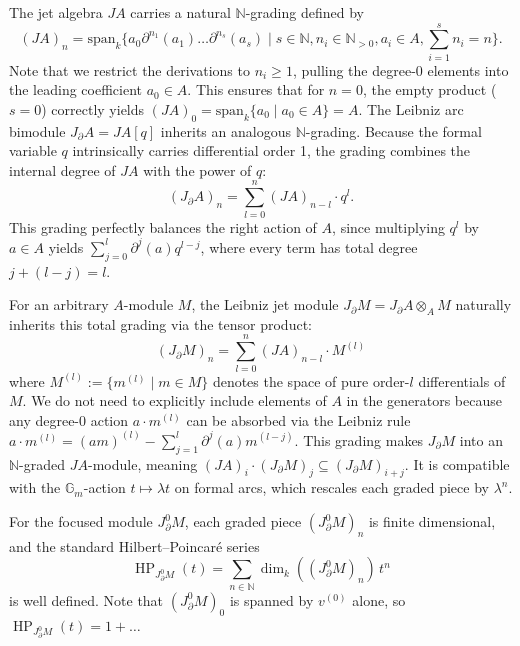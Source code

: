 \documentclass[a4paper, 12pt]{amsart}
\theoremstyle{definition}
\theoremstyle{remark}
\begin{document}
The jet algebra $JA$ carries a natural $\mathbb{N}$-grading defined by
\begin{equation*}
  (JA)_n = \text{span}_k\{a_0 \partial^{n_1}(a_1)\dots\partial^{n_s}(a_s) \mid s \in \mathbb{N}, n_i \in \mathbb{N}_{>0}, a_i \in A, \sum_{i=1}^s n_i = n\}.
\end{equation*}
Note that we restrict the derivations to $n_i \ge 1$, pulling the degree-0 elements into the leading coefficient $a_0 \in A$. This ensures that for $n=0$, the empty product ($s=0$) correctly yields $(JA)_0 = \text{span}_k\{a_0 \mid a_0 \in A\} = A$.
The Leibniz arc bimodule $J_\partial A = JA[q]$ inherits an analogous $\mathbb{N}$-grading. Because the formal variable $q$ intrinsically carries differential order 1, the grading combines the internal degree of $JA$ with the power of $q$:
\begin{equation*}
  (J_\partial A)_n = \sum_{l=0}^n (JA)_{n-l} \cdot q^l.
\end{equation*}
This grading perfectly balances the right action of $A$, since multiplying $q^l$ by $a \in A$ yields $\sum_{j=0}^l \partial^j(a) q^{l-j}$, where every term has total degree $j + (l-j) = l$.

For an arbitrary $A$-module $M$, the Leibniz jet module $J_\partial M = J_\partial A \otimes_A M$ naturally inherits this total grading via the tensor product:
\begin{equation*}
  (J_\partial M)_n = \sum_{l=0}^n (JA)_{n-l} \cdot M^{(l)}
\end{equation*}
where $M^{(l)} := \{ m^{(l)} \mid m \in M \}$ denotes the space of pure order-$l$ differentials of $M$. We do not need to explicitly include elements of $A$ in the generators because any degree-0 action $a \cdot m^{(l)}$ can be absorbed via the Leibniz rule $a \cdot m^{(l)} = (am)^{(l)} - \sum_{j=1}^l \partial^j(a) m^{(l-j)}$.
This grading makes $J_\partial M$ into an $\mathbb{N}$-graded $JA$-module, meaning $(JA)_i \cdot (J_\partial M)_j \subseteq (J_\partial M)_{i+j}$. It is compatible with the $\mathbb{G}_m$-action $t \mapsto \lambda t$ on formal arcs, which rescales each graded piece by $\lambda^n$.

For the focused module $J^0_\partial M$,
each graded piece $(J^0_\partial M)_n$ is finite dimensional,
and the standard Hilbert--Poincar\'{e} series
\begin{equation*}
  \operatorname{HP}_{J^0_\partial M}(t) = \sum_{n \in \mathbb{N}} \dim_k((J^0_\partial M)_n)\, t^n
\end{equation*}
is well defined.
Note that $(J^0_\partial M)_0$ is spanned by $v^{(0)}$ alone,
so $\operatorname{HP}_{J^0_\partial M}(t) = 1 + \dots$
\end{document}
